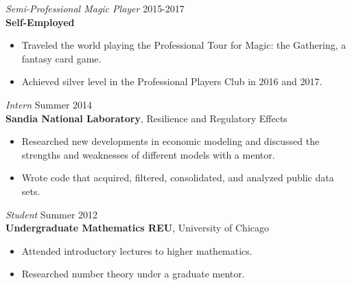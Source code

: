 \documentclass[margin, 10pt]{res} %
\begin{document}
\begin{resume}
{\sl Semi-Professional Magic Player} \hfill 2015-2017 \\
\textbf{Self-Employed}

\begin{itemize} \itemsep -2pt %
	\item Traveled the world playing the Professional Tour for Magic: the Gathering, a fantasy card game. 
	\item Achieved silver level in the Professional Players Club in 2016 and 2017.  
\end{itemize}

%

{\sl Intern} \hfill Summer 2014 \\
\textbf{Sandia National Laboratory}, Resilience and Regulatory Effects

\begin{itemize} \itemsep -2pt
\item Researched new developments in economic modeling and discussed the strengths and weaknesses of different models with a mentor. 
\item Wrote code that acquired, filtered, consolidated, and analyzed public data sets. 
\end{itemize}
 
{\sl Student} \hfill Summer 2012 \\
\textbf{Undergraduate Mathematics REU}, University of Chicago 
\begin{itemize} \itemsep -2pt
\item Attended introductory lectures to higher mathematics.
\item Researched number theory under a graduate mentor.  
\end{itemize} 


\end{resume}
\end{document}
